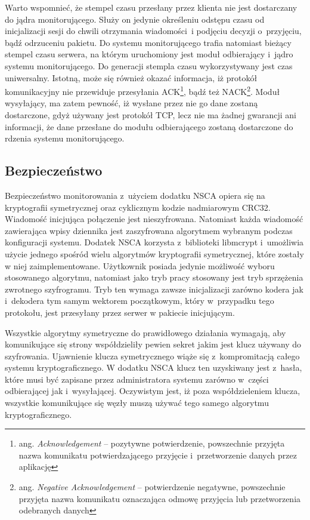 Warto wspomnieć, że stempel czasu przesłany przez klienta nie jest
dostarczany do jądra monitorującego. Służy on jedynie określeniu
odstępu czasu od inicjalizacji sesji do chwili otrzymania wiadomości~i
podjęciu decyzji o~przyjęciu, bądź odrzuceniu pakietu. Do systemu
monitorującego trafia natomiast bieżący stempel czasu serwera, na
którym uruchomiony jest moduł odbierający i~jądro systemu
monitorującego. Do generacji stempla czasu wykorzystywany jest czas
uniwersalny. Istotną, może się również okazać informacja, iż protokół
komunikacyjny nie przewiduje przesyłania ACK\footnote {ang. {\em
    Acknowledgement} -- pozytywne potwierdzenie, powszechnie przyjęta
  nazwa komunikatu potwierdzającego przyjęcie i~przetworzenie danych
  przez aplikację}, bądź też NACK\footnote{ang. {\em
    Negative Acknowledgement} -- potwierdzenie negatywne, powszechnie
  przyjęta nazwa komunikatu oznaczająca odmowę przyjęcia lub
  przetworzenia odebranych danych}. Moduł wysyłający, ma zatem
pewność, iż wysłane przez nie go dane zostaną dostarczone, gdyż
używany jest protokół TCP, lecz nie ma żadnej gwarancji ani
informacji, że dane przesłane do modułu odbierającego zostaną
dostarczone do rdzenia systemu monitorującego.

\subsection[Bezpieczeństwo][Bezpieczeństwo]{Bezpieczeństwo}

Bezpieczeństwo monitorowania z~użyciem dodatku NSCA opiera się na
kryptografii symetrycznej oraz cyklicznym kodzie nadmiarowym
CRC32. Wiadomość inicjująca połączenie jest nieszyfrowana. Natomiast
każda wiadomość zawierająca wpisy dziennika jest zaszyfrowana
algorytmem wybranym podczas konfiguracji systemu. Dodatek NSCA
korzysta z~biblioteki libmcrypt i~umożliwia użycie jednego spośród
wielu algorytmów kryptografii symetrycznej, które zostały w niej
zaimplementowane. Użytkownik posiada jedynie możliwość wyboru
stosowanego algorytmu, natomiast jako tryb pracy stosowany jest tryb
sprzężenia zwrotnego szyfrogramu. Tryb ten wymaga zawsze inicjalizacji
zarówno kodera jak i~dekodera tym samym wektorem początkowym, który
w~przypadku tego protokołu, jest przesyłany przez serwer w pakiecie
inicjującym.

Wszystkie algorytmy symetryczne do prawidłowego działania wymagają,
aby komunikujące się strony współdzieliły pewien sekret jakim jest
klucz używany do szyfrowania. Ujawnienie klucza symetrycznego wiąże
się z~kompromitacją całego systemu kryptograficznego. W dodatku NSCA
klucz ten uzyskiwany jest z~hasła, które musi być zapisane przez
administratora systemu zarówno w~części odbierającej jak
i~wysyłającej. Oczywistym jest, iż poza współdzieleniem klucza,
wszystkie komunikujące się węzły muszą używać tego samego algorytmu
kryptograficznego.

